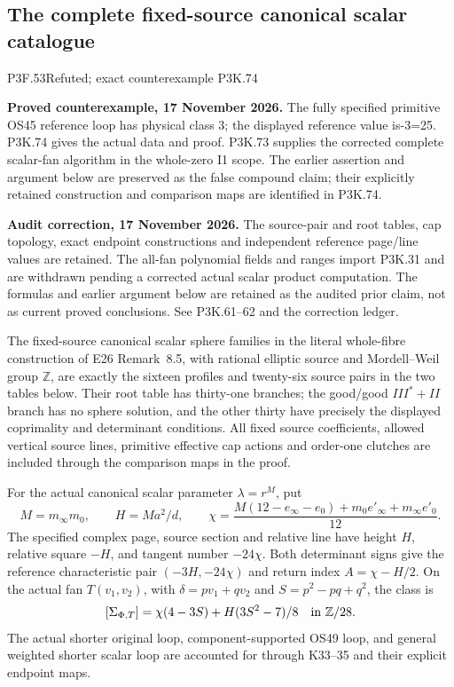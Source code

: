 \subsection{The complete fixed-source canonical scalar catalogue}
\begin{statement}{P3F.53}{Refuted; exact counterexample P3K.74}
\par\noindent\textbf{Proved counterexample, 17 November 2026.} The fully specified primitive OS45 reference loop has physical class 3; the displayed reference value is-3=25. P3K.74 gives the actual data and proof. P3K.73 supplies the corrected complete scalar-fan algorithm in the whole-zero I1 scope. The earlier assertion and argument below are preserved as the false compound claim; their explicitly retained construction and comparison maps are identified in P3K.74.

\par\noindent\textbf{Audit correction, 17 November 2026.} The source-pair and root tables, cap topology, exact endpoint constructions and independent reference page/line values are retained. The all-fan polynomial fields and ranges import P3K.31 and are withdrawn pending a corrected actual scalar product computation. The formulas and earlier argument below are retained as the audited prior claim, not as current proved conclusions. See P3K.61--62 and the correction ledger.
\medskip


The fixed-source canonical scalar sphere families in the literal
whole-fibre construction of E26 Remark~8.5, with rational elliptic
source and Mordell--Weil group \(\mathbb Z\), are exactly the
sixteen profiles and twenty-six source pairs in the two tables below.
Their root table has thirty-one branches; the good/good
\(III^*+II\) branch has no sphere solution, and the other thirty
have precisely the displayed coprimality and determinant conditions.
All fixed source coefficients, allowed vertical source lines,
primitive effective cap actions and order-one clutches are included
through the comparison maps in the proof.

For the actual canonical scalar parameter \(\lambda=r^M\), put
\[
 M=m_\infty m_0,\qquad H=Ma^2/d,\qquad
 \chi=\frac{M(12-e_\infty-e_0)+m_0e'_\infty+m_\infty e'_0}{12}.
\]
The specified complex page, source section and relative line have
height \(H\), relative square \(-H\), and tangent number
\(-24\chi\). Both determinant signs give the reference characteristic
pair \((-3H,-24\chi)\) and return index \(A=\chi-H/2\).
On the actual fan \(T(v_1,v_2)\), with
\(\delta=pv_1+qv_2\) and \(S=p^2-pq+q^2\), the class is
\[
 [\Sigma_{\Phi,T}]
       =\chi(4-3S)+H(3S^2-7)/8\quad\hbox{in }\mathbb Z/28.
\]
The actual shorter original loop, component-supported OS49 loop,
and general weighted shorter scalar loop are accounted for through
K33--35 and their explicit endpoint maps.
\end{statement}
